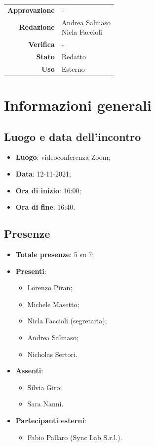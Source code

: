 \documentclass[11pt]{article}
\begin{document}
\begin{titlepage}
\begin{center}
			
			\vfill
			
			
			\begin{tabular}{r|l}
				\textbf{Approvazione} &  -\\
				\textbf{Redazione} &  \parbox[t]{5cm}{Andrea Salmaso \\Nicla Faccioli}\\
				\textbf{Verifica} &  -\\
				\textbf{Stato} & Redatto \\
				\textbf{Uso} & Esterno
			\end{tabular}
			\vfill
			
		\end{center}
	\end{titlepage}
	
	\section{Informazioni generali}
		\subsection{Luogo e data dell'incontro}
			\begin{itemize}
				\item \textbf{Luogo}: videoconferenza Zoom;
				\item \textbf{Data}: 12-11-2021;
				\item \textbf{Ora di inizio}: 16:00;
				\item \textbf{Ora di fine}: 16:40.
			\end{itemize}
		
		\subsection{Presenze}
			\begin{itemize}
				\item \textbf{Totale presenze}: 5 su 7;
				\item \textbf{Presenti}:
				\begin{itemize}
					\item Lorenzo Piran; 
					\item Michele Masetto;
					\item Nicla Faccioli (segretaria);
					\item Andrea Salmaso;
					\item Nicholas Sertori.
				\end{itemize}
				\item \textbf{Assenti}: 
					\begin{itemize}
						\item Silvia Giro;
						\item Sara Nanni.
					\end{itemize}
				\item \textbf{Partecipanti esterni}:
				\begin{itemize}
					\item Fabio Pallaro (Sync Lab S.r.l.).
				\end{itemize}
			\end{itemize}
		
\end{document}
